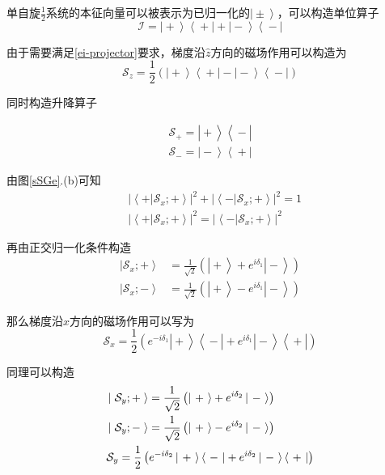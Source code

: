 \documentclass[UTF8,12pt]{article}
\providecommand\Ket[1]{\left|\right. #1 \left.\right\rangle}
\providecommand\Bra[1]{\left\langle\right. #1 \left.\right|}
\providecommand\Bracket[2]{\left\langle #1 \big| #2 \right\rangle}
\numberwithin{equation}{subsection}
\begin{document}
	单自旋$\frac{1}{2}$系统的本征向量可以被表示为已归一化的$\Ket{\pm}$，可以构造单位算子$$\mathcal I = \Ket{+}\Bra{+}+\Ket{-}\Bra{-}$$
	
	由于需要满足\ref{ei-projector}要求，梯度沿$\hat z$方向的磁场作用可以构造为
		\begin{equation}
			\mathcal S_z = \frac{1}{2}\left(\Ket{+}\Bra{+}-\Ket{-}\Bra{-}\right)
			\label{Sz}
		\end{equation}
	
	同时构造升降算子
	\begin{snugshade}
	\begin{subequations}
		\begin{align}
			\mathcal S_+=\Ket{+}\Bra{-}\label{sUp}\\
			\mathcal S_-=\Ket{-}\Bra{+}\label{sDown}
		\end{align}
	\end{subequations}
	\end{snugshade}

	由图\ref{sSGe}.(b)可知
	\begin{equation}
		\begin{aligned}
			&|\Bracket{+}{\mathcal S_x;+}|^2+|\Bracket{-}{\mathcal S_x;+}|^2=1\\
			&|\Bracket{+}{\mathcal S_x;+}|^2=|\Bracket{-}{\mathcal S_x;+}|^2
		\end{aligned}
		\label{expectation}
	\end{equation}
	
	再由正交归一化条件构造\begin{align*}
		\Ket{\mathcal S_x;+} &= \frac{1}{\sqrt{2}}\left(\Ket{+}+e^{i\delta_1}\Ket{-}\right)\\
		\Ket{\mathcal S_x;-} &= \frac{1}{\sqrt{2}}\left(\Ket{+}-e^{i\delta_1}\Ket{-}\right)
	\end{align*}

	那么梯度沿$\hat x$方向的磁场作用可以写为\begin{equation}
		\mathcal S_x = \frac{1}{2}\left(e^{-i\delta_1}\Ket{+}\Bra{-}+e^{i\delta_1}\Ket{-}\Bra{+}\right)
		\label{Sx}
	\end{equation}

	同理可以构造\begin{align}
		&\Ket{\mathcal S_y;+} = \frac{1}{\sqrt{2}}\left(\Ket{+}+e^{i\delta_2}\Ket{-}\right)\notag\\
		&\Ket{\mathcal S_y;-} = \frac{1}{\sqrt{2}}\left(\Ket{+}-e^{i\delta_2}\Ket{-}\right)\notag\\
		&\mathcal S_y = \frac{1}{2}\left(e^{-i\delta_2}\Ket{+}\Bra{-}+e^{i\delta_2}\Ket{-}\Bra{+}\right)
		\label{Sy}
	\end{align}
	
\end{document}
